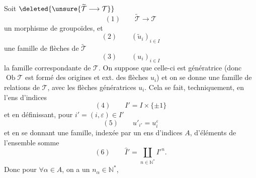 Soit $\deleted{\unsure{\widetilde{\mathcal T}\longrightarrow\mathcal T}}$
\[(1)\qquad\widetilde{\mathcal T}\longrightarrow\mathcal T\]
un morphisme de groupoïdes, et
\[(2)\qquad(\widetilde u_i)_{i\in I}\]
une famille de flèches de $\widetilde{\mathcal T}$
\[(3)\qquad(u_i)_{i\in I}\]
la famille correspondante de $\mathcal T$. On suppose que celle-ci est génératrice (donc $\operatorname{Ob}\mathcal T$ est formé des origines et ext. des flèches $u_i$) et on se donne une famille de relations  de $\mathcal T$, avec les flèches génératrices $u_i$. Cela se fait, techniquement, en  l'ens d'indices
\[(4)\qquad I'=I\times\{\pm1\}\]
et en définissant, pour $i'=(i,\varepsilon)\in I'$
\[(5)\qquad u'_{i'}=u_i^\varepsilon\]
et en se donnant une famille,  indexée par un ens d'indices $A$, d'éléments de l'ensemble somme
\[(6)\qquad\widehat I'=\coprod_{n\in\mathbb N^*}I'^n.\]
Donc pour $\forall\alpha\in A$, on a un $n_\alpha\in\mathbb N^*$,
